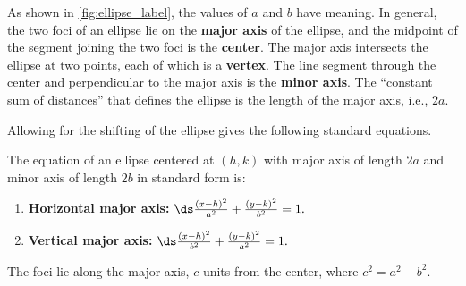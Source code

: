 As shown in \autoref{fig:ellipse_label}, the values of $a$ and $b$ have
meaning. In general, the two foci of an ellipse lie on the \textbf{major axis} of the ellipse, and the midpoint of the segment joining the two foci is the \textbf{center}. The major axis intersects the ellipse at two points, each of which is a \textbf{vertex}. The line segment through the center and perpendicular to the major axis is the \textbf{minor axis}. The ``constant sum of distances'' that defines the ellipse is the length of the major axis, i.e., $2a$.


Allowing for the shifting of the ellipse gives the following standard equations.
	
\begin{keyidea}\label{idea:ellipse}%
The equation of an ellipse centered at $(h,k)$ with major axis of length $2a$ and minor axis of length $2b$ in standard form is:
\begin{enumerate}
	\item	\textbf{Horizontal major axis:} $\ds \frac{(x-h)^2}{a^2}+\frac{(y-k)^2}{b^2}=1.$
	\item	\textbf{Vertical major axis:} $\ds \frac{(x-h)^2}{b^2}+\frac{(y-k)^2}{a^2}=1.$
\end{enumerate}
The foci lie along the major axis, $c$ units from the center, where $c^2=a^2-b^2$.
\end{keyidea}

